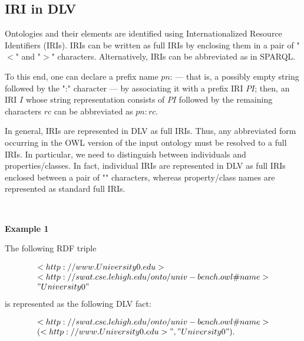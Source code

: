 \documentclass[oneside]{book}
\begin{document}
\subsection{IRI in DLV}

Ontologies and their elements are identified using Internationalized Resource Identifiers (IRIs). IRIs can be written as full IRIs by enclosing them in a pair of "$<$" and "$>$" characters. Alternatively, IRIs can be abbreviated as in SPARQL. 

To this end, one can declare a prefix name $pn$: — that is, a possibly empty string followed by the ":" character — by associating it with a prefix IRI $PI$; then, an IRI $I$ whose string representation consists of $PI$ followed by the remaining characters $rc$ can be abbreviated as $pn:rc$.

In general, IRIs are represented in DLV as full IRIs. Thus, any abbreviated form occurring in the OWL version of the input ontology must be resolved to a full IRIs. In particular, we need to distinguish between individuals and properties/classes. In fact, individual IRIs are represented in DLV as full IRIs enclosed between a pair of "" characters, whereas property/class names are represented as standard full IRIs.

\

\textbf{Example 1}

The following RDF triple

\[
\begin{array}{l}
<http://www.University0.edu> \\
<http://swat.cse.lehigh.edu/onto/univ-bench.owl\#name> \\
"University0"
\end{array}
\]
is represented as the following DLV fact:

\[
\begin{array}{l}
<http://swat.cse.lehigh.edu/onto/univ-bench.owl\#name>\\
(<http://www.University0.edu>", "University0").
\end{array}
\]



\end{document}
